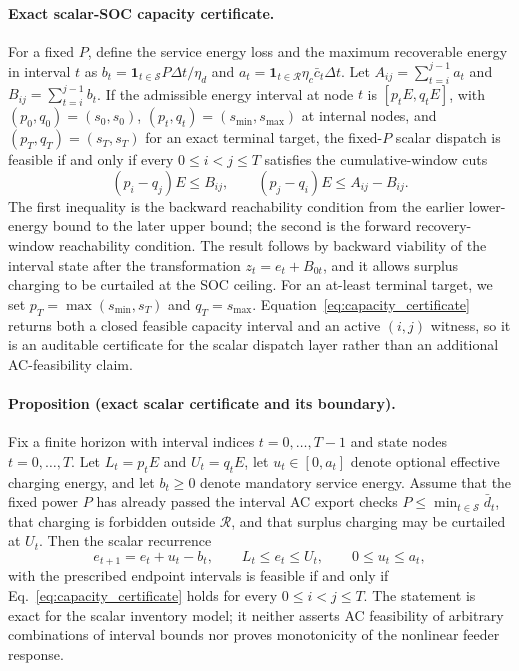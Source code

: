 \documentclass[11pt]{article}
\begin{document}
\paragraph{Exact scalar-SOC capacity certificate.} For a fixed $P$, define the service energy loss and the maximum recoverable energy in interval $t$ as $b_t=\mathbf{1}_{t\in\mathcal S}P\Delta t/\eta_d$ and $a_t=\mathbf{1}_{t\in\mathcal R}\eta_c\bar c_t\Delta t$. Let $A_{ij}=\sum_{t=i}^{j-1}a_t$ and $B_{ij}=\sum_{t=i}^{j-1}b_t$. If the admissible energy interval at node $t$ is $[p_tE,q_tE]$, with $(p_0,q_0)=(s_0,s_0)$, $(p_t,q_t)=(s_{\min},s_{\max})$ at internal nodes, and $(p_T,q_T)=(s_T,s_T)$ for an exact terminal target, the fixed-$P$ scalar dispatch is feasible if and only if every $0\leq i<j\leq T$ satisfies the cumulative-window cuts
\begin{equation}
(p_i-q_j)E\leq B_{ij},\qquad (p_j-q_i)E\leq A_{ij}-B_{ij}.
\label{eq:capacity_certificate}
\end{equation}
The first inequality is the backward reachability condition from the earlier lower-energy bound to the later upper bound; the second is the forward recovery-window reachability condition. The result follows by backward viability of the interval state after the transformation $z_t=e_t+B_{0t}$, and it allows surplus charging to be curtailed at the SOC ceiling. For an at-least terminal target, we set $p_T=\max(s_{\min},s_T)$ and $q_T=s_{\max}$. Equation~\eqref{eq:capacity_certificate} returns both a closed feasible capacity interval and an active $(i,j)$ witness, so it is an auditable certificate for the scalar dispatch layer rather than an additional AC-feasibility claim.

\paragraph{Proposition (exact scalar certificate and its boundary).} Fix a finite horizon with interval indices $t=0,\ldots,T-1$ and state nodes $t=0,\ldots,T$. Let $L_t=p_tE$ and $U_t=q_tE$, let $u_t\in[0,a_t]$ denote optional effective charging energy, and let $b_t\geq0$ denote mandatory service energy. Assume that the fixed power $P$ has already passed the interval AC export checks $P\leq\min_{t\in\mathcal S}\bar d_t$, that charging is forbidden outside $\mathcal R$, and that surplus charging may be curtailed at $U_t$. Then the scalar recurrence
\[
 e_{t+1}=e_t+u_t-b_t,
 \qquad L_t\leq e_t\leq U_t,
 \qquad 0\leq u_t\leq a_t,
\]
with the prescribed endpoint intervals is feasible if and only if Eq.~\eqref{eq:capacity_certificate} holds for every $0\leq i<j\leq T$. The statement is exact for the scalar inventory model; it neither asserts AC feasibility of arbitrary combinations of interval bounds nor proves monotonicity of the nonlinear feeder response.
\end{document}
